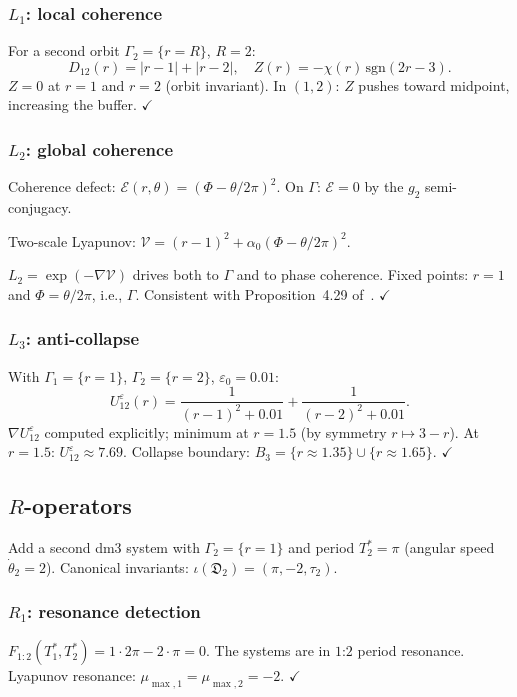\documentclass[12pt, oneside]{book}
\theoremstyle{plain}
\theoremstyle{definition}
\theoremstyle{remark}
\newcommand{\dm}{\mathfrak{D}}
\newcommand{\Orb}{\Gamma}
\newcommand{\eps}{\varepsilon}
\newcommand{\abs}[1]{\left|#1\right|}
\begin{document}
\subsubsection{$L_1$: local coherence}

For a second orbit $\Orb_2=\{r=R\}$, $R=2$:
\[
  D_{12}(r) = \abs{r-1} + \abs{r-2},\quad
  Z(r) = -\chi(r)\,\mathrm{sgn}(2r-3).
\]
$Z=0$ at $r=1$ and $r=2$ (orbit invariant). In $(1,2)$: $Z$
pushes toward midpoint, increasing the buffer. $\checkmark$

\subsubsection{$L_2$: global coherence}

Coherence defect: $\mathcal{E}(r,\theta)=(\Phi-\theta/2\pi)^2$.
On $\Orb$: $\mathcal{E}=0$ by the $g_2$ semi-conjugacy.

Two-scale Lyapunov: $\mathcal{V}=(r-1)^2+\alpha_0(\Phi-\theta/2\pi)^2$.

$L_2=\exp(-\nabla\mathcal{V})$ drives both to $\Orb$ and to phase
coherence. Fixed points: $r=1$ and $\Phi=\theta/2\pi$, i.e., $\Orb$.
Consistent with Proposition~4.29 of~\cite{Paper1}. $\checkmark$

\subsubsection{$L_3$: anti-collapse}

With $\Orb_1=\{r=1\}$, $\Orb_2=\{r=2\}$, $\eps_0=0.01$:
\[
  U_{12}^\eps(r)
  = \frac{1}{(r-1)^2+0.01} + \frac{1}{(r-2)^2+0.01}.
\]
$\nabla U_{12}^\eps$ computed explicitly; minimum at $r=1.5$
(by symmetry $r\mapsto 3-r$). At $r=1.5$: $U_{12}^\eps\approx 7.69$.
Collapse boundary: $B_3=\{r\approx 1.35\}\cup\{r\approx 1.65\}$. $\checkmark$

\subsection{\texorpdfstring{$R$}{R}-operators}

Add a second dm3 system with $\Orb_2=\{r=1\}$ and period $T_2^*=\pi$
(angular speed $\dot\theta_2=2$). Canonical invariants:
$\iota(\dm_2)=(\pi,-2,\tau_2)$.

\subsubsection{$R_1$: resonance detection}

$F_{1:2}(T_1^*,T_2^*)=1\cdot 2\pi-2\cdot\pi=0$.
The systems are in $1$:$2$ period resonance.
Lyapunov resonance: $\mu_{\max,1}=\mu_{\max,2}=-2$. $\checkmark$
\end{document}
